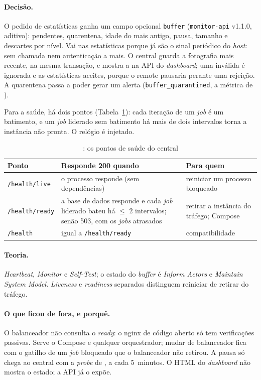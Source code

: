 \paragraph{Decisão.}
O pedido de estatísticas ganha um campo opcional \texttt{buffer} (\texttt{monitor-api} v1.1.0, aditivo): pendentes,
quarentena, idade do mais antigo, pausa, tamanho e descartes por nível. Vai nas estatísticas porque já são o sinal
periódico do \emph{host}: sem chamada nem autenticação a mais. O central guarda a fotografia mais recente, na mesma
transação, e mostra-a na API do \emph{dashboard}; uma inválida é ignorada e as estatísticas aceites, porque o remote
pausaria perante uma rejeição. A quarentena passa a poder gerar um alerta (\texttt{buffer\_quarantined}, a métrica
de ).

Para a saúde, há dois pontos (Tabela~\ref{tab:health}): cada iteração de um \emph{job} é um batimento, e um
\emph{job} liderado sem batimento há mais de dois intervalos torna a instância não pronta. O relógio é injetado.

\begin{table}[htbp]
  \centering\small
  \caption{: os pontos de saúde do central}
  \label{tab:health}
  \begin{tabularx}{\textwidth}{lXX}
    \toprule
    Ponto & Responde 200 quando & Para quem \\
    \midrule
    \texttt{/health/live} & o processo responde (sem dependências) & reiniciar um processo bloqueado \\
    \texttt{/health/ready} & a base de dados responde e cada \emph{job} liderado bateu há $\le$ 2 intervalos;
      senão 503, com os \emph{jobs} atrasados & retirar a instância do tráfego; Compose \\
    \texttt{/health} & igual a \texttt{/health/ready} & compatibilidade \\
    \bottomrule
  \end{tabularx}
\end{table}

\paragraph{Teoria.}
\emph{Heartbeat}, \emph{Monitor} e \emph{Self-Test}; o estado do \emph{buffer} é \emph{Inform Actors} e
\emph{Maintain System Model}. \emph{Liveness} e \emph{readiness} separados distinguem reiniciar de retirar do
tráfego.

\paragraph{O que ficou de fora, e porquê.}
O balanceador não consulta o \emph{ready}: o nginx de código aberto só tem verificações passivas. Serve o Compose e
qualquer orquestrador; mudar de balanceador fica com o gatilho de um \emph{job} bloqueado que o balanceador não
retirou. A pausa só chega ao central com a \emph{probe} de , a cada 5~minutos. O HTML do \emph{dashboard}
não mostra o estado; a API já o expõe.

